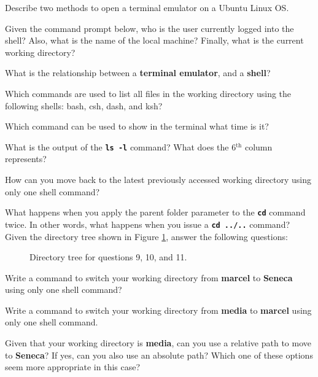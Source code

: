 \begin{exercises}
   \item Describe two methods to open a terminal emulator on a Ubuntu Linux OS.
   \item Given the command prompt below, who is the user currently logged into the shell? Also, what is the name of the local machine? Finally, what is the current working directory?
   \item What is the relationship between a \textbf{terminal emulator}, and a \textbf{shell}?
   \item Which commands are used to list all files in the working directory using the following shells: bash, csh, dash, and ksh?
   \item Which command can be used to show in the terminal what time is it?
   \item What is the output of the \textbf{\texttt{ls -l}} command? What does the 6$^{}$ column represents?
   \item How can you move back to the latest previously accessed working directory using only one shell command?
   \item What happens when you apply the parent folder parameter to the \textbf{\texttt{cd}} command twice. In other words, what happens when you issue a \textbf{\texttt{cd ../..}} command?
Given the directory tree shown in Figure \ref{fig:ch2_ex_dirtree}, answer the following questions:
\begin{figure}[!htbp]
  \centering
        
        \caption{Directory tree for questions 9, 10, and 11.}
        \label{fig:ch2_ex_dirtree}
\end{figure}
   \item Write a command to switch your working directory from \textbf{marcel} to \textbf{Seneca} using only one shell command?
   \item Write a command to switch your working directory from \textbf{media} to \textbf{marcel} using only one shell command.
   \item Given that your working directory is \textbf{media}, can you use a relative path to move to \textbf{Seneca}? If yes, can you also use an absolute path? Which one of these options seem more appropriate in this case?
\end{exercises}

